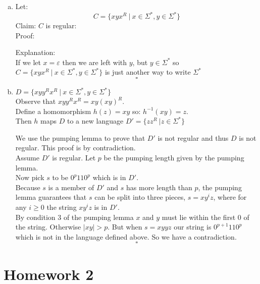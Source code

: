 \documentclass{article}
\begin{document}
\begin{enumerate}[a)]
    \item Let: \[C = \{xyx^R ~|~ x \in \Sigma^*, y \in \Sigma^*\}\]
        Claim: $C$ is regular: \\
        Proof:


    Explanation:\\
    If we let $x = \varepsilon$ then we are left with $y$, but $y \in \Sigma^*$ so 
    $C = \{xyx^R ~|~ x \in \Sigma^*, y \in \Sigma^*\}$
    is just another way to write $\Sigma^*$
    \[\square\]

    \item $D = \{xyy^Rx^R ~|~ x \in \Sigma^*, y \in \Sigma^*\}$\\
    Observe that $xyy^Rx^R = xy(xy)^R.$ \\
    Define a homomorphism $h(z)=xy$ so: $h^{-1}(xy) = z$.\\
    Then $h$ maps $D$ to a new language $D' = \{zz^R\ | z \in \Sigma^*\}$

    We use the pumping lemma to prove that $D'$ is not regular and thus $D$ is not regular.
    This proof is by contradiction.\\
    Assume $D'$ is regular. Let $p$ be the pumping length given by the pumping lemma. \\
    Now pick $s$ to be $0^p110^p$ which is in $D'$.\\
    Because $s$ is a member of $D'$ and $s$ has more length than $p$,
    the pumping lemma guarantees that $s$ can be split into three pieces,
    $s = xy^iz$, where for any $i \geq 0$ the string $xy^iz$ is in $D'$. \\
    By condition 3 of the pumping lemma $x$ and $y$ must lie within the first $0$ of the
    string. Otherwise $|xy| > p$. But when $s=xyyz$ our string is $0^{p+1}110^p$ which
    is not in the language defined above. So we have a contradiction.
    \[\square\]
\end{enumerate}

\newpage
\section*{Homework 2}
\end{document}
